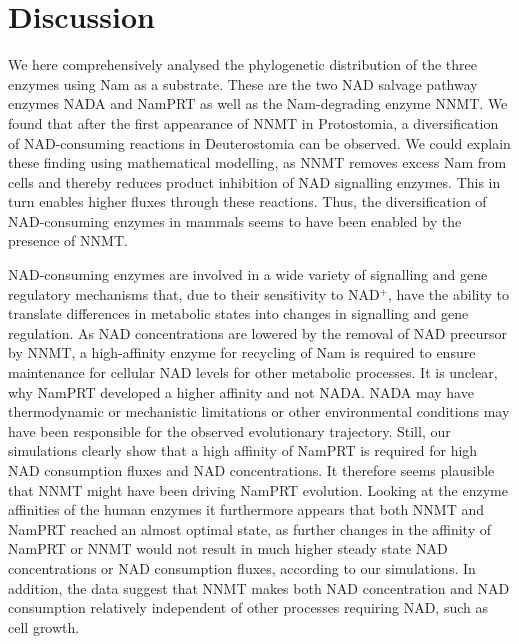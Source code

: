 
\section{Discussion}

We here comprehensively analysed the phylogenetic distribution of the three enzymes using Nam as a substrate. These are the two NAD salvage pathway enzymes NADA and NamPRT as well as the Nam-degrading enzyme NNMT. We found that after the first appearance of NNMT in Protostomia, a diversification of NAD-consuming reactions in Deuterostomia can be observed. We could explain these finding using mathematical modelling, as NNMT removes excess Nam from cells and thereby reduces product inhibition of NAD signalling enzymes. This in turn enables higher fluxes through these reactions. Thus, the diversification of NAD-consuming enzymes in mammals seems to have been enabled by the presence of NNMT.

NAD-consuming enzymes are involved in a wide variety of signalling and gene regulatory mechanisms that, due to their sensitivity to NAD$^{+}$, have the ability to translate differences in metabolic states into changes in signalling and gene regulation. As NAD concentrations are lowered by the removal of NAD precursor by NNMT, a high-affinity enzyme for recycling of Nam is required to ensure maintenance for cellular NAD levels for other metabolic processes. It is unclear, why NamPRT developed a higher affinity and not NADA. NADA may have thermodynamic or mechanistic limitations or other environmental conditions may have been responsible for the observed evolutionary trajectory.  Still, our simulations clearly show that a high affinity of NamPRT is required for high NAD consumption fluxes and NAD concentrations. It therefore seems plausible that NNMT might have been driving NamPRT evolution. Looking at the enzyme affinities of the human enzymes it furthermore appears that both NNMT and NamPRT reached an almost optimal state, as further changes in the affinity of NamPRT or NNMT would not result in much higher steady state NAD concentrations or NAD consumption fluxes, according to our simulations. In addition, the data suggest that NNMT makes both NAD concentration and NAD consumption relatively independent of other processes requiring NAD, such as cell growth.

